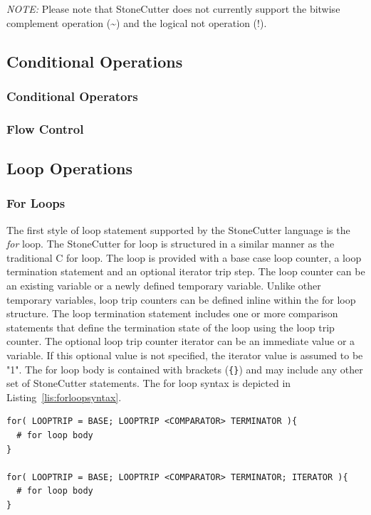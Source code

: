 \documentclass{article}
\begin{document}
\textit{NOTE:} Please note that StoneCutter does not currently support the bitwise complement 
operation (\textasciitilde) and the logical not operation (!).  

\clearpage
\subsection{Conditional Operations}
\label{sec:ConditionalOperations}

\subsubsection{Conditional Operators}
\label{sec:ConditionalOperators}

\subsubsection{Flow Control}
\label{sec:FlowControl}

\clearpage
\subsection{Loop Operations}
\label{sec:LoopOperations}

\subsubsection{For Loops}
\label{sec:ForLoops}

The first style of loop statement supported by the StoneCutter language is the 
\textit{for} loop.  The StoneCutter for loop is structured in a similar manner as the 
traditional C for loop.  The loop is provided with a base case loop counter, a loop 
termination statement and an optional iterator trip step.  The loop counter 
can be an existing variable or a newly defined temporary variable.  Unlike other 
temporary variables, loop trip counters can be defined inline within the for loop 
structure.  The loop termination statement includes one or more comparison 
statements that define the termination state of the loop using the loop trip 
counter.  The optional loop trip counter iterator can be an immediate value or a variable.  
If this optional value is not specified, the iterator value is assumed to be "1".  The for loop body 
is contained with brackets (\texttt{\{\}}) and may include any other set of StoneCutter statements.  The for loop 
syntax is depicted in Listing~\ref{lis:forloopsyntax}.     

\vspace{0.125in}
\begin{lstlisting}[frame=single,style=base,caption={For Loop Syntax},captionpos=b,label={lis:forloopsyntax}]
for( LOOPTRIP = BASE; LOOPTRIP <COMPARATOR> TERMINATOR ){
  # for loop body
}

for( LOOPTRIP = BASE; LOOPTRIP <COMPARATOR> TERMINATOR; ITERATOR ){
  # for loop body
}
\end{lstlisting}
\end{document}
